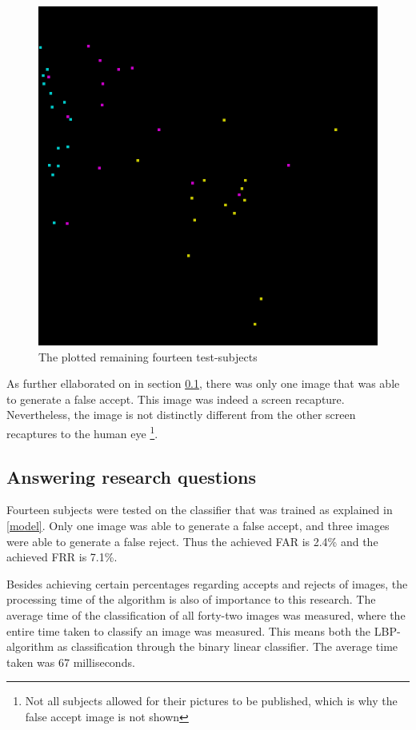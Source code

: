 \documentclass{sig-alternate-br}
\begin{document}
\begin{figure}[h]
	\includegraphics[scale=0.4]{tests}
	\caption{The plotted remaining fourteen test-subjects}
	\label{fig:tests}
\end{figure}

As further ellaborated on in section \ref{stats}, there was only one image that was able to generate a false accept. This image was indeed a screen recapture. Nevertheless, the image is not distinctly different from the other screen recaptures to the human eye \footnote{Not all subjects allowed for their pictures to be published, which is why the false accept image is not shown}.

\subsection{Answering research questions} \label{stats}
Fourteen subjects were tested on the classifier that was trained as explained in \ref{model}. Only one image was able to generate a false accept, and three images were able to generate a false reject. Thus the achieved FAR is 2.4\% and the achieved FRR is 7.1\%.

Besides achieving certain percentages regarding accepts and rejects of images, the processing time of the algorithm is also of importance to this research. The average time of the classification of all forty-two images was measured, where the entire time taken to classify an image was measured. This means both the LBP-algorithm as classification through the binary linear classifier. The average time taken was 67 milliseconds.
\end{document}
